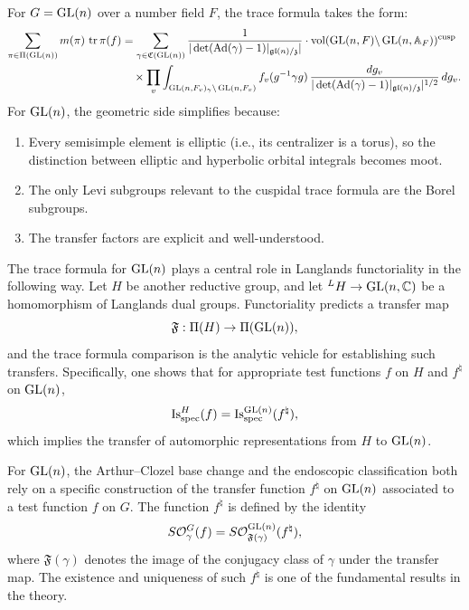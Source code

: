 \begin{theorem}
For $G = \operatorname{GL}(n)$ over a number field $F$, the trace formula takes the form:
\begin{align}
\sum_{\pi \in \Pi(\operatorname{GL}(n))} m(\pi)\,\operatorname{tr}\pi(f) &= \sum_{\gamma \in \mathfrak{C}(\operatorname{GL}(n))} \frac{1}{|\det(\operatorname{Ad}(\gamma) - 1)|_{\mathfrak{gl}(n)/\mathfrak{z}}|} \cdot \operatorname{vol}(\operatorname{GL}(n,F)\backslash \operatorname{GL}(n,\mathbb{A}_F))^{\mathrm{cusp}} \notag \\
&\quad \times \prod_v \int_{\operatorname{GL}(n,F_v)_\gamma \backslash \operatorname{GL}(n,F_v)} f_v(g^{-1}\gamma g)\,\frac{dg_v}{|\det(\operatorname{Ad}(\gamma)-1)|_{\mathfrak{gl}(n)/\mathfrak{z}}|^{1/2}}\,dg_v.
\end{align}
For $\operatorname{GL}(n)$, the geometric side simplifies because:
\begin{enumerate}
    \item Every semisimple element is elliptic (i.e., its centralizer is a torus), so the distinction between elliptic and hyperbolic orbital integrals becomes moot.
    \item The only Levi subgroups relevant to the cuspidal trace formula are the Borel subgroups.
    \item The transfer factors are explicit and well-understood.
\end{enumerate}
\end{theorem}

The trace formula for $\operatorname{GL}(n)$ plays a central role in Langlands functoriality in the following way. Let $H$ be another reductive group, and let ${}^L H \to \operatorname{GL}(n, \mathbb{C})$ be a homomorphism of Langlands dual groups. Functoriality predicts a transfer map
\[
\mathfrak{F}: \Pi(H) \to \Pi(\operatorname{GL}(n)),
\]
and the trace formula comparison is the analytic vehicle for establishing such transfers. Specifically, one shows that for appropriate test functions $f$ on $H$ and $f^{\natural}$ on $\operatorname{GL}(n)$,
\[
\operatorname{Is}_{\mathrm{spec}}^H(f) = \operatorname{Is}_{\mathrm{spec}}^{\operatorname{GL}(n)}(f^{\natural}),
\]
which implies the transfer of automorphic representations from $H$ to $\operatorname{GL}(n)$.

\begin{remark}
For $\operatorname{GL}(n)$, the Arthur--Clozel base change and the endoscopic classification both rely on a specific construction of the transfer function $f^\natural$ on $\operatorname{GL}(n)$ associated to a test function $f$ on $G$. The function $f^\natural$ is defined by the identity
\[
S\mathcal{O}_\gamma^G(f) = S\mathcal{O}_{\mathfrak{F}(\gamma)}^{\operatorname{GL}(n)}(f^\natural),
\]
where $\mathfrak{F}(\gamma)$ denotes the image of the conjugacy class of $\gamma$ under the transfer map. The existence and uniqueness of such $f^\natural$ is one of the fundamental results in the theory.
\end{remark}

